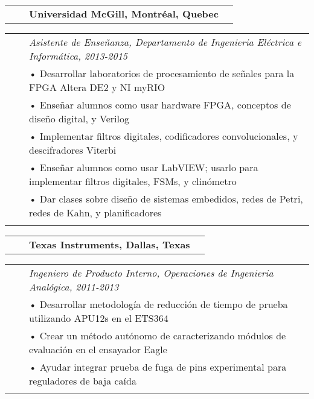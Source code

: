 \documentclass{minimal}
\begin{document}
\pagebreak

\begin{tabular}{ p{1.5cm} p{1cm} p{10cm} >{\raggedleft\arraybackslash}p{3cm} }
& & \textbf{Universidad McGill, Montréal, Quebec} & \\
\end{tabular}

\begin{tabular}{ p{1.5cm} p{1cm} p{16cm} }
& & \textit{Asistente de Enseñanza, Departamento de Ingenieria Eléctrica e Informática, 2013-2015}\\
& & • Desarrollar laboratorios de procesamiento de señales para la FPGA Altera DE2 y NI myRIO\\
& & • Enseñar alumnos como usar hardware FPGA, conceptos de diseño digital, y Verilog\\
& & • Implementar filtros digitales, codificadores convolucionales, y descifradores Viterbi\\
& & • Enseñar alumnos como usar LabVIEW; usarlo para implementar filtros digitales, FSMs, y clinómetro\\
& & • Dar clases sobre diseño de sistemas embedidos, redes de Petri, redes de Kahn, y planificadores\\
& & \\
\end{tabular}

\begin{tabular}{ p{1.5cm} p{1cm} p{10cm} >{\raggedleft\arraybackslash}p{3cm} }
& & \textbf{Texas Instruments, Dallas, Texas} & \\
\end{tabular}

\begin{tabular}{ p{1.5cm} p{1cm} p{16cm} }
& & \textit{Ingeniero de Producto Interno, Operaciones de Ingenieria Analógica, 2011-2013}\\
& & • Desarrollar metodología de reducción de tiempo de prueba utilizando APU12s en el ETS364\\
& & • Crear un método autónomo de caracterizando módulos de evaluación en el ensayador Eagle\\
& & • Ayudar integrar prueba de fuga de pins experimental para reguladores de baja caída\\
& & \\
\end{tabular}
\end{document}
